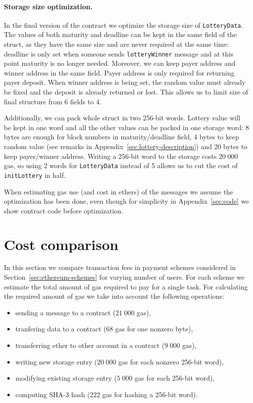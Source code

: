 \documentclass[a4paper]{article}
\begin{document}
    \paragraph{Storage size optimization.}
    In the final version of the contract we optimize the storage size
    of \verb!LotteryData!. The values of both maturity and deadline
    can be kept in the same field of the struct, as they have the same
    size and are never required at the same time: deadline is only set
    when someone sends \verb!lotteryWinner! message and at this point
    maturity is no longer needed.
    Moreover, we can keep payer address and winner address in the same
    field. Payer address is only required for returning payer
    deposit. When winner address is being set, the random value must
    already be fixed and the deposit is already returned or lost. This
    allows us to limit size of final structure from 6 fields to 4.
    
    Additionally, we can pack whole struct in two 256-bit
    words. Lottery value will be kept in one word and all the other
    values can be packed in one storage word: 8 bytes are enough for
    block numbers in maturity/deadline field, 4 bytes to keep random
    value (see remarks in Appendix~\ref{sec:lottery-description}) and
    20 bytes to keep payer/winner address.  Writing a 256-bit word to
    the storage costs $20\;000$ gas, so using 2 words for \verb!LotteryData!
    instead of 5 allows us to cut the cost of \verb!initLottery! in half.

    When estimating gas use (and cost in ethers) of the messages we
    assume the optimization has been done, even though for simplicity
    in Appendix~\ref{sec:code} we show contract code before optimization.
    
\section{Cost comparison}
\label{sec:costs}
    In this section we compare transaction fees in payment schemes
    considered in Section~\ref{sec:ethereum-schemes} for varying
    number of users. For each scheme we estimate the total amount of
    gas required to pay for a single task.
    For calculating the required amount of gas we take into account the
    following operations:
    \begin{itemize}
    \item sending a message to a contract ($21\;000$ gas),
    \item tranfering data to a contract ($68$ gas for one nonzero byte),
    \item transferring ether to other account in a contract ($9\;000$ gas),
    \item writing new storage entry ($20\;000$ gas for each nonzero 256-bit word),
    \item modifying existing storage entry ($5\;000$ gas for each 256-bit word),
    \item computing SHA-3 hash ($222$ gas for hashing a 256-bit word).
    \end{itemize}
\end{document}
